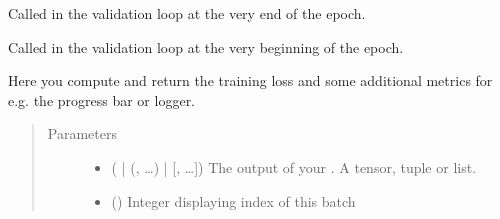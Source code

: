 \documentclass[letterpaper,10pt,english]{sphinxmanual}
\begin{document}
\begin{fulllineitems}
\begin{fulllineitems}
\label{\detokenize{pages/ml:vipercore.ml.plmodels.MultilabelSupervisedModel.on_validation_epoch_end}}
\sphinxAtStartPar
Called in the validation loop at the very end of the epoch.

\end{fulllineitems}


\begin{fulllineitems}
\label{\detokenize{pages/ml:vipercore.ml.plmodels.MultilabelSupervisedModel.on_validation_epoch_start}}
\sphinxAtStartPar
Called in the validation loop at the very beginning of the epoch.

\end{fulllineitems}


\begin{fulllineitems}
\label{\detokenize{pages/ml:vipercore.ml.plmodels.MultilabelSupervisedModel.training_step}}
\sphinxAtStartPar
Here you compute and return the training loss and some additional metrics for e.g.
the progress bar or logger.
\begin{quote}\begin{description}
\item[{Parameters}] \leavevmode\begin{itemize}
\item {} 
\sphinxAtStartPar
{} ( | (, …) | {[}, …{]}) \textendash{} The output of your . A tensor, tuple or list.

\item {} 
\sphinxAtStartPar
{} () \textendash{} Integer displaying index of this batch


\end{itemize}
\end{description}
\end{quote}
\end{fulllineitems}
\end{fulllineitems}
\end{document}
